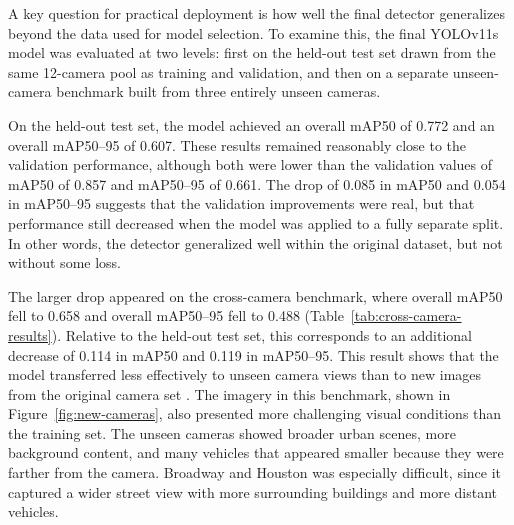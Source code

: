 A key question for practical deployment is how well the final detector generalizes 
beyond the data used for model selection. To examine this, the final YOLOv11s model 
was evaluated at two levels: first on the held-out test set drawn from the same 
12-camera pool as training and validation, and then on a separate unseen-camera 
benchmark built from three entirely unseen cameras.

On the held-out test set, the model achieved an overall mAP50 of 0.772 and an overall
mAP50--95 of 0.607. These results remained reasonably close to the validation performance, 
although both were lower than the validation values of mAP50 of 0.857 and mAP50--95 of 0.661.
The drop of 0.085 in mAP50 and 0.054 in mAP50--95 suggests that the validation improvements
were real, but that performance still decreased when the model was applied to a fully
separate split. In other words, the detector generalized well within the original 
dataset, but not without some loss.

The larger drop appeared on the cross-camera benchmark, where overall mAP50 fell to 
0.658 and overall mAP50--95 fell to 0.488 (Table~\ref{tab:cross-camera-results}). 
Relative to the held-out test set, this corresponds to an additional decrease of
0.114 in mAP50 and 0.119 in mAP50--95. This result shows that the model transferred less 
effectively to unseen camera views than to new images from the original camera set
\cite{hsu2019progressivedomainadaptationobject, vis_domain_adapt_paper}. 
The imagery in this benchmark, shown in Figure~\ref{fig:new-cameras}, 
also presented more challenging visual conditions than the training set. The unseen 
cameras showed broader urban scenes, more background content, and many vehicles 
that appeared smaller because they were farther from the camera. Broadway and 
Houston was especially difficult, since it captured a wider street view with 
more surrounding buildings and more distant vehicles.

